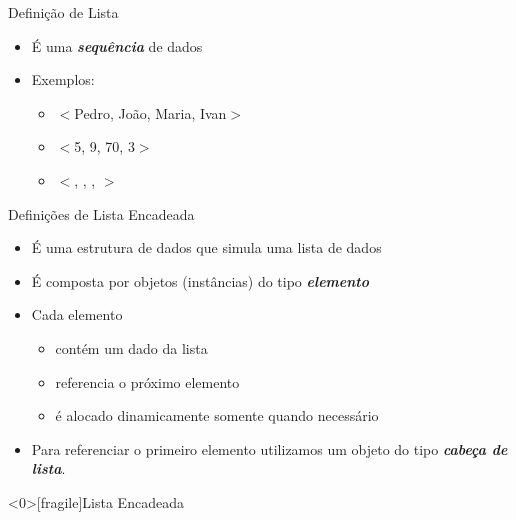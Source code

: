 \documentclass[12pt,table,xcolor={dvipsnames}]{beamer}
\begin{document}
\begin{frame}[fragile]{Definição de Lista}
	\begin{itemize}
		\item É uma \textit{\textbf{sequência}} de dados
		\item Exemplos:
		\begin{itemize}
			\item $<$Pedro, João, Maria, Ivan$>$
			\item $<$5, 9, 70, 3$>$
			\item $<$\smiley, \phone, \davidsstar, \twonotes$>$
		\end{itemize}
	\end{itemize}
\end{frame}

\begin{frame}[fragile]{Definições de Lista Encadeada}
\begin{itemize}
\item É uma estrutura de dados que simula uma lista de dados
\item É composta por objetos (instâncias) do tipo \textbf{\textit{elemento}}
\item Cada elemento 
\begin{itemize}
\item contém um dado da lista 
\item referencia o próximo elemento
\item é alocado dinamicamente somente quando necessário
\end{itemize}
\item Para referenciar o primeiro elemento utilizamos um objeto do tipo \textbf{\textit{cabeça de lista}}.
\end{itemize}
\end{frame}


\begin{frame}<0>[fragile]{Lista Encadeada}
\begin{center}
\end{center}
\end{frame}
\end{document}

